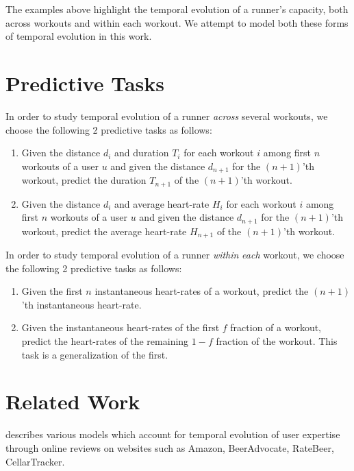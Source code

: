 \documentclass{acm_proc_article-sp}
\begin{document}
The examples above highlight the temporal evolution of a runner's capacity, both across workouts and within each workout. We attempt to model both these forms of temporal evolution in this work.

\section{Predictive Tasks}
In order to study temporal evolution of a runner \emph{across} several workouts, we choose the following 2 predictive tasks as follows:
\begin{enumerate}
\item Given the distance $d_i$ and duration $T_i$ for each workout $i$ among first $n$ workouts of a user $u$ and given the distance $d_{n+1}$ for the $(n+1)$'th workout, predict the duration $T_{n+1}$ of the $(n+1)$'th workout.
\item Given the distance $d_i$ and average heart-rate $H_i$ for each workout $i$ among first $n$ workouts of a user $u$ and given the distance $d_{n+1}$ for the $(n+1)$'th workout, predict the average heart-rate $H_{n+1}$ of the $(n+1)$'th workout.
\end{enumerate}

In order to study temporal evolution of a runner \emph{within} \emph{each} workout, we choose the following 2 predictive tasks as follows:

\begin{enumerate}
\item Given the first $n$ instantaneous heart-rates of a workout, predict the $(n+1)$'th instantaneous heart-rate.
\item Given the instantaneous heart-rates of the first $f$ fraction of a workout, predict the heart-rates of the remaining $1-f$ fraction of the workout. This task is a generalization of the first.
\end{enumerate}

\section{Related Work}
\cite{www13} describes various models which account for temporal evolution of user expertise through online reviews on websites such as Amazon, BeerAdvocate, RateBeer, CellarTracker. 
\end{document}
